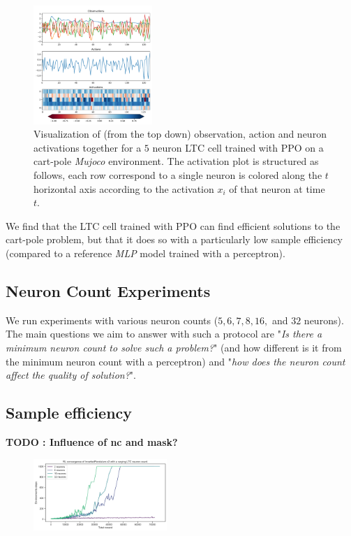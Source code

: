 \begin{figure}[h!]
    \centering
    \includegraphics[width=0.4\textwidth]{figures/5n_solution.pdf}
    \caption{Visualization of (from the top down) observation, action and neuron activations together for a $5$ neuron LTC cell trained with PPO on a cart-pole \textit{Mujoco} environment. The activation plot is structured as follows, each row correspond to a single neuron is colored along the $t$ horizontal axis according to the activation $x_i$ of that neuron at time $t$.}
\end{figure}

We find that the LTC cell trained with PPO can find efficient solutions to the cart-pole problem, but that it does so with a particularly low sample efficiency (compared to a reference \textit{MLP} model trained with a perceptron). 




\subsection{Neuron Count Experiments}
We run experiments with various neuron counts ($5,6,7,8,16,$ and $32$ neurons). The main questions we aim to answer with such a protocol are "\textit{Is there a minimum neuron count to solve such a problem?}" (and how different is it from the minimum neuron count with a perceptron) and "\textit{how does the neuron count affect the quality of solution?}". 


\subsection{Sample efficiency}
\textbf{TODO : Influence of nc and mask?}
\begin{figure}[h!]
    \centering
    \includegraphics[width=0.45\textwidth]{figures/convergence_rate.png}
    \caption{}
\end{figure}

